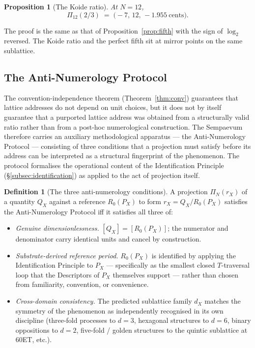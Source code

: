 \documentclass[11pt,a4paper]{article}
\newtheorem{proposition}[theorem]{Proposition}
\theoremstyle{definition}
\newtheorem{definition}[theorem]{Definition}
\theoremstyle{remark}
\begin{document}
\begin{proposition}[The Koide ratio]\label{prop:koide}
At $N=12$,
\[
\Pi_{12}(2/3) \;=\; \bigl(-7,\,12,\,-1.955\ \text{cents}\bigr).
\]
\end{proposition}

The proof is the same as that of Proposition~\ref{prop:fifth} with the sign of $\log_{2}$ reversed. The Koide ratio and the perfect fifth sit at mirror points on the same sublattice.

\subsection{The Anti-Numerology Protocol}\label{subsec:anti-numerology}

The convention-independence theorem (Theorem~\ref{thm:conv}) guarantees that lattice addresses do not depend on unit choices, but it does not by itself guarantee that a purported lattice address was obtained from a structurally valid ratio rather than from a post-hoc numerological construction. The Sempaevum therefore carries an auxiliary methodological apparatus --- the Anti-Numerology Protocol --- consisting of three conditions that a projection must satisfy before its address can be interpreted as a structural fingerprint of the phenomenon. The protocol formalises the operational content of the Identification Principle (\S\ref{subsec:identification}) as applied to the act of projection itself.

\begin{definition}[The three anti-numerology conditions]\label{def:N1N2N3}
A projection $\Pi_{N}(r_{X})$ of a quantity $Q_{X}$ against a reference $R_{0}(P_{X})$ to form $r_{X} = Q_{X}/R_{0}(P_{X})$ satisfies the Anti-Numerology Protocol iff it satisfies all three of:
\begin{itemize}[leftmargin=*]
\item[\textbf{(N1)}] \emph{Genuine dimensionlessness.} $[Q_{X}] = [R_{0}(P_{X})]$; the numerator and denominator carry identical units and cancel by construction.
\item[\textbf{(N2)}] \emph{Substrate-derived reference period.} $R_{0}(P_{X})$ is identified by applying the Identification Principle to $P_{X}$ --- specifically as the smallest closed $T$-traversal loop that the Descriptors of $P_{X}$ themselves support --- rather than chosen from familiarity, convention, or convenience.
\item[\textbf{(N3)}] \emph{Cross-domain consistency.} The predicted sublattice family $d_{X}$ matches the symmetry of the phenomenon as independently recognised in its own discipline (three-fold processes to $d=3$, hexagonal structures to $d=6$, binary oppositions to $d=2$, five-fold / golden structures to the quintic sublattice at $60$ET, etc.).
\end{itemize}
\end{definition}
\end{document}
